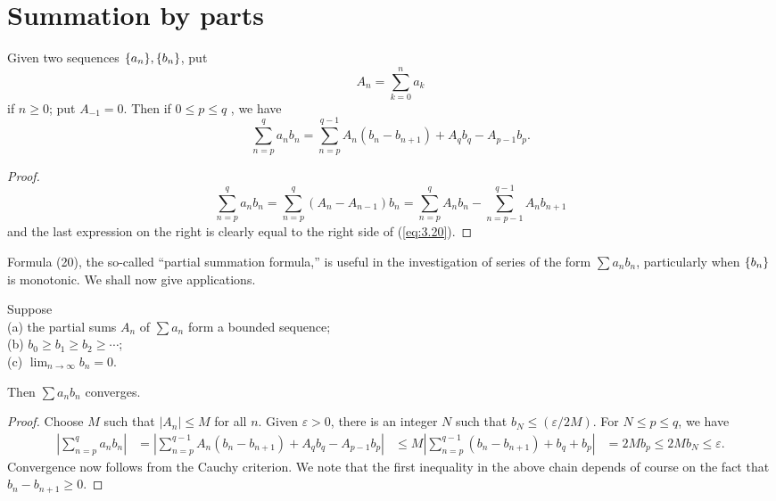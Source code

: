 \section{Summation by parts}
\begin{thm}
    \label{thm:3.41}
    Given two sequences $\protect\{a_n\}, \protect\{b_n\}$, put
    \begin{equation*}
        A_n = \sum_{k=0}^{n} a_k
    \end{equation*}
    if $n \geq 0$; put $A_{-1} = 0$. Then if $0\leq p\leq q$ , we have
    \begin{equation}
        \label{eq:3.20}
        \sum_{n=p}^{q} a_n b_n
        = \sum_{n=p}^{q-1} A_n (b_n - b_{n+1}) + A_q b_q - A_{p-1} b_p.
    \end{equation}
\end{thm}

\begin{proof}
    \begin{equation*}
        \sum_{n=p}^{q} a_n b_n
        = \sum_{n=p}^{q} (A_n - A_{n-1}) b_n
        = \sum_{n=p}^{q} A_n b_n - \sum_{n=p-1}^{q-1} A_n b_{n+1}        
    \end{equation*}
    and the last expression on the right is clearly equal to the right side of (\ref{eq:3.20}).
\end{proof}

Formula (20), the so-called ``partial summation formula,''
is useful in the investigation of series of the form $\sum a_n b_n$,
particularly when $\protect\{b_n\}$ is monotonic.
We shall now give applications.

\begin{thm} 
    \label{thm:3.42}
    Suppose\\
    (a) the partial sums $A_n$ of $\sum a_n$ form a bounded sequence;\\
    (b) $b_0 \geq b_1 \geq b_2 \geq \cdots$;\\
    (c) $\lim_{n \to \infty} b_n = 0$.

Then $\sum a_n b_n$ converges.
\end{thm}

\begin{proof}
    Choose $M$ such that $|A_n| \leq M$ for all $n$.
    Given $\varepsilon > 0$, there is an integer $N$ such that $b_N \leq (\varepsilon/2M)$. For $N \leq p \leq q$, we have
    \begin{align*}
        \left|\sum_{n=p}^{q} a_n b_n\right|
        &= \left| \sum_{n=p}^{q-1} A_n (b_n - b_{n+1}) + A_q b_q - A_{p-1} b_p \right|
        &\leq M \left| \sum_{n=p}^{q-1} (b_n - b_{n+1}) + b_q + b_p \right|
        &= 2 M b_p \leq 2 M b_N \leq \varepsilon.
    \end{align*}
    Convergence now follows from the Cauchy criterion.
    We note that the first inequality in the above chain depends of course on the fact that $b_n - b_{n+1} \geq 0$.
\end{proof}

